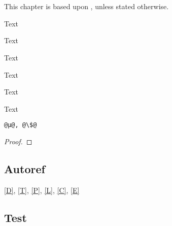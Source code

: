 \chapter{}\label{Ch.4}
This chapter is based upon \citep{}, unless stated otherwise.

\begin{defn}[Title]\label{D}
    Text
\end{defn}
\begin{thm}[Title]\label{T}
    Text
\end{thm}
\begin{prop}[Title]\label{P}
    Text
\end{prop}
\begin{coro}[Title]\label{C}
    Text
\end{coro}
\begin{exmp}[Title]\label{E}
    Text
\end{exmp}
\begin{exmp}\label{E1}
    Text
\end{exmp}

\begin{lstlisting}[caption={Text}, style=CustomR, label={L}]
@µ@, @\$@
\end{lstlisting}


\begin{proof}
\end{proof}



\section{Autoref}
\autoref{D}, \autoref{T}, \autoref{P}, \autoref{L}, \autoref{C}, \autoref{E}

\section{Test}
\begin{defn}
    \blindtext
\end{defn}
\blindtext[10]
